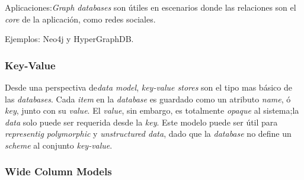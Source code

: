 Aplicaciones:\textit{Graph databases} son útiles en escenarios donde las relaciones son el \textit{core} de la aplicación, como redes sociales.

Ejemplos: Neo4j y HyperGraphDB.

\subsubsection{Key-Value}

Desde una perspectiva de\textit{data model}, \textit{key-value stores} son el tipo mas básico de las \textit{ databases}. Cada \textit{item} en la \textit{database} es guardado como un atributo \textit{name}, ó \textit{key}, junto con su \textit{value}. El \textit{value}, sin embargo, es totalmente \textit{opaque} al sistema;la \textit{data} solo puede ser requerida desde la \textit{key}. Este modelo puede ser útil para \textit{representig polymorphic} y \textit{unstructured data}, dado que la \textit{database} no define un \textit{scheme} al conjunto \textit{key-value}.

\subsubsection{Wide Column Models}

%
%





